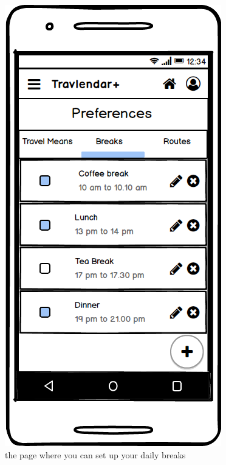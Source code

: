 \documentclass[11pt]{article}
\begin{document}
	\begin{figure}
		\centering
		\includegraphics[width=0.7\linewidth]{PreferencesBreaks.png}
		\caption{the page where you can set up your daily breaks}
		\label{fig:preferencesbreaks}
	\end{figure}
	
\end{document}
